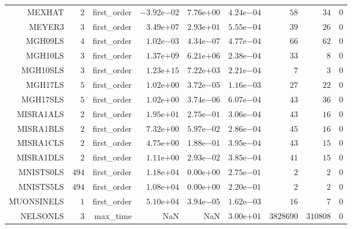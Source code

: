 \begin{longtable}{rrrrrrrrr}
MEXHAT & \(     2\) & first\_order & \(-3.92\)e\(-02\) & \( 7.76\)e\(+00\) & \( 4.24\)e\(-04\) & \(    58\) & \(    34\) & \(     0\) \\
MEYER3 & \(     3\) & first\_order & \( 3.49\)e\(+07\) & \( 2.93\)e\(+01\) & \( 5.55\)e\(-04\) & \(    39\) & \(    26\) & \(     0\) \\
MGH09LS & \(     4\) & first\_order & \( 1.02\)e\(-03\) & \( 4.34\)e\(-07\) & \( 4.77\)e\(-04\) & \(    66\) & \(    62\) & \(     0\) \\
MGH10LS & \(     3\) & first\_order & \( 1.37\)e\(+09\) & \( 6.21\)e\(+06\) & \( 2.38\)e\(-04\) & \(    33\) & \(     8\) & \(     0\) \\
MGH10SLS & \(     3\) & first\_order & \( 1.23\)e\(+15\) & \( 7.22\)e\(+03\) & \( 2.21\)e\(-04\) & \(     7\) & \(     3\) & \(     0\) \\
MGH17LS & \(     5\) & first\_order & \( 1.02\)e\(+00\) & \( 3.72\)e\(-05\) & \( 1.16\)e\(-03\) & \(    27\) & \(    22\) & \(     0\) \\
MGH17SLS & \(     5\) & first\_order & \( 1.02\)e\(+00\) & \( 3.74\)e\(-06\) & \( 6.07\)e\(-04\) & \(    43\) & \(    36\) & \(     0\) \\
MISRA1ALS & \(     2\) & first\_order & \( 1.95\)e\(+01\) & \( 2.75\)e\(-01\) & \( 3.06\)e\(-04\) & \(    43\) & \(    16\) & \(     0\) \\
MISRA1BLS & \(     2\) & first\_order & \( 7.32\)e\(+00\) & \( 5.97\)e\(-02\) & \( 2.86\)e\(-04\) & \(    45\) & \(    16\) & \(     0\) \\
MISRA1CLS & \(     2\) & first\_order & \( 4.75\)e\(+00\) & \( 1.88\)e\(-01\) & \( 3.95\)e\(-04\) & \(    43\) & \(    15\) & \(     0\) \\
MISRA1DLS & \(     2\) & first\_order & \( 1.11\)e\(+00\) & \( 2.93\)e\(-02\) & \( 3.85\)e\(-04\) & \(    41\) & \(    15\) & \(     0\) \\
MNISTS0LS & \(   494\) & first\_order & \( 1.18\)e\(+04\) & \( 0.00\)e\(+00\) & \( 2.75\)e\(-01\) & \(     2\) & \(     2\) & \(     0\) \\
MNISTS5LS & \(   494\) & first\_order & \( 1.08\)e\(+04\) & \( 0.00\)e\(+00\) & \( 2.20\)e\(-01\) & \(     2\) & \(     2\) & \(     0\) \\
MUONSINELS & \(     1\) & first\_order & \( 5.10\)e\(+04\) & \( 3.94\)e\(-05\) & \( 1.62\)e\(-03\) & \(    16\) & \(     7\) & \(     0\) \\
NELSONLS & \(     3\) & max\_time &       NaN &       NaN & \( 3.00\)e\(+01\) & \(3828690\) & \(310808\) & \(     0\) \\

\end{longtable}
